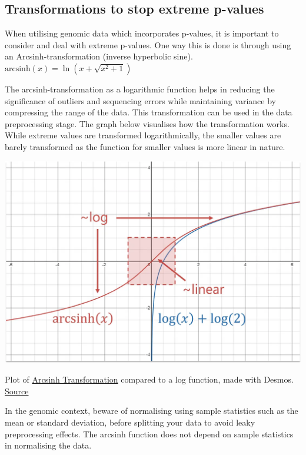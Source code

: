 \documentclass[
]{book}
\begin{document}
\subsection{Transformations to stop extreme p-values}\label{transformations-to-stop-extreme-p-values}

When utilising genomic data which incorporates p-values, it is important to consider and deal with extreme p-values. One way this is done is through using an Arcsinh-transformation (inverse hyperbolic sine).
\(\text{arcsinh}(x) = \ln \left( x + \sqrt{x^2 + 1} \right)\)

The arcsinh-transformation as a logarithmic function helps in reducing the significance of outliers and sequencing errors while maintaining variance by compressing the range of the data. This transformation can be used in the data preprocessing stage. The graph below visualises how the transformation works. While extreme values are transformed logarithmically, the smaller values are barely transformed as the function for smaller values is more linear in nature.

\includegraphics{images/arcsinh.png}

Plot of \href{https://miro.medium.com/v2/resize:fit:1100/format:webp/1*glJtHk1HRZpYHsk79QxgwQ.png}{Arcsinh Transformation} compared to a log function, made with Desmos. \href{https://towardsdatascience.com/transform-data-with-hyperbolic-sine-e39e9275b6ba}{Source}

In the genomic context, beware of normalising using sample statistics such as the mean or standard deviation, before splitting your data to avoid leaky preprocessing effects. The arcsinh function does not depend on sample statistics in normalising the data.
\end{document}

